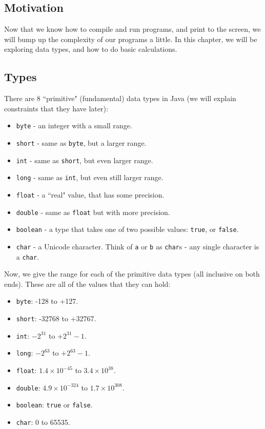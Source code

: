 
\subsection{Motivation}
Now that we know how to compile and run programs, and print to the screen, we will bump up the complexity of our programs a little. In this chapter, we will be exploring data types, and how to do basic calculations.

\subsection{Types}
There are 8 ``primitive" (fundamental) data types in Java (we will explain constraints that they have later):
\begin{itemize}
\item \verb|byte| - an integer with a small range.
\item \verb|short| - same as \verb|byte|, but a larger range.
\item \verb|int| - same as \verb|short|, but even larger range.
\item \verb|long| - same as \verb|int|, but even still larger range.
\item \verb|float| - a ``real" value, that has some precision.
\item \verb|double| - same as \verb|float| but with more precision.
\item \verb|boolean| - a type that takes one of two possible values: \verb|true|, or \verb|false|.
\item \verb|char| - a Unicode character. Think of \verb|a| or \verb|b| as \verb|char|s - any single character is a \verb|char|.
\end{itemize}

\noindent Now, we give the range for each of the primitive data types (all inclusive on both ends). These are all of the values that they can hold:
\begin{itemize}
\item \verb|byte|: -128 to +127.
\item \verb|short|: -32768 to +32767.
\item \verb|int|: $-2^{31}$ to $+2^{31}-1$.
\item \verb|long|: $-2^{63}$ to $+2^{63}-1$.
\item \verb|float|: $1.4 \times 10^{-45}$ to $3.4 \times 10^{38}$.
\item \verb|double|: $4.9 \times 10^{-324}$ to $1.7 \times 10^{308}$.
\item \verb|boolean|: \verb|true| or \verb|false|.
\item \verb|char|: 0 to 65535.
\end{itemize}

